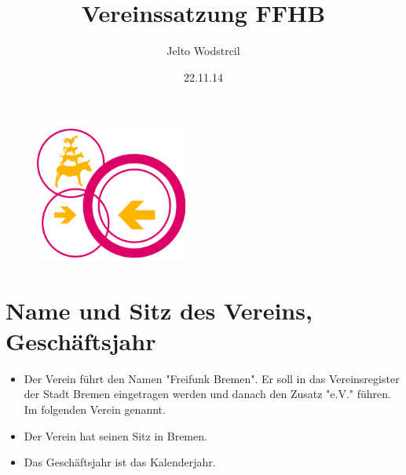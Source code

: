 \documentclass[a4paper,10pt]{article}
\title{Vereinssatzung FFHB}
\author{Jelto Wodstrcil}
\date{22.11.14}
\begin{document}
\maketitle

\begin{figure}[!]
 \includegraphics[width=5cm]{logo}
 \centering
\end{figure}

\section{Name und Sitz des Vereins, Geschäftsjahr}
  \begin{itemize}
    \item Der Verein führt den Namen "Freifunk Bremen". Er soll in das Vereinsregister der Stadt Bremen eingetragen werden und danach den Zusatz "e.V." führen. Im folgenden Verein genannt.
    \item Der Verein hat seinen Sitz in Bremen.
    \item Das Geschäftsjahr ist das Kalenderjahr.
  \end{itemize}
\end{document}
